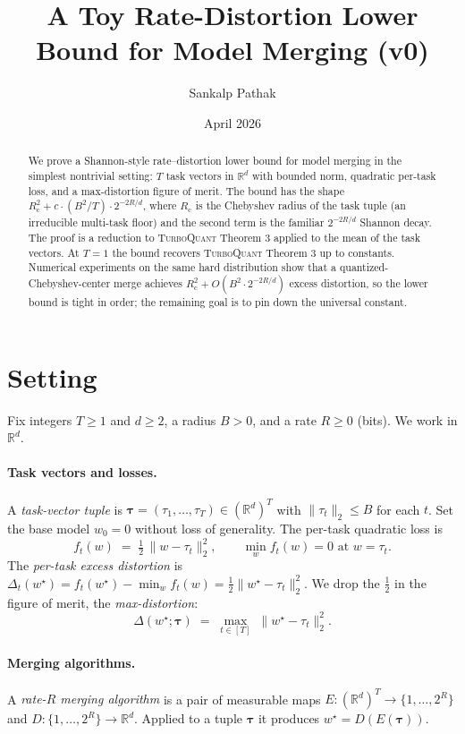 \documentclass{article}
\title{A Toy Rate-Distortion Lower Bound for Model Merging (v0)}
\author{Sankalp Pathak}
\date{April 2026}
\theoremstyle{remark}
\newcommand{\R}{\mathbb{R}}
\newcommand{\cheb}{R_{\mathrm{c}}}
\begin{document}
\maketitle

\begin{abstract}
We prove a Shannon-style rate--distortion lower bound for
model merging in the simplest nontrivial setting: $T$ task vectors
in $\R^d$ with bounded norm, quadratic per-task loss, and a
max-distortion figure of merit. The bound has the shape
$\cheb^2 + c \cdot (B^2/T) \cdot 2^{-2R/d}$, where $\cheb$ is the
Chebyshev radius of the task tuple (an irreducible multi-task floor)
and the second term is the familiar $2^{-2R/d}$ Shannon decay.
The proof is a reduction to \textsc{TurboQuant} Theorem 3 applied to
the mean of the task vectors. At $T=1$ the bound recovers
\textsc{TurboQuant} Theorem 3 up to constants. Numerical experiments
on the same hard distribution show that a quantized-Chebyshev-center
merge achieves $\cheb^2 + O(B^2 \cdot 2^{-2R/d})$ excess distortion,
so the lower bound is tight in order; the remaining goal is
to pin down the universal constant.
\end{abstract}

\section{Setting}\label{sec:setting}

Fix integers $T \geq 1$ and $d \geq 2$, a radius $B > 0$, and a rate
$R \geq 0$ (bits). We work in $\R^d$.

\paragraph{Task vectors and losses.} A \emph{task-vector tuple} is
$\boldsymbol{\tau} = (\tau_1,\dots,\tau_T) \in (\R^d)^T$ with
$\|\tau_t\|_2 \leq B$ for each $t$. Set the base model $w_0 = 0$
without loss of generality. The per-task quadratic loss is
\[
  f_t(w) \;=\; \tfrac{1}{2}\,\|w - \tau_t\|_2^2, \qquad
  \min_w f_t(w) = 0 \text{ at } w = \tau_t.
\]
The \emph{per-task excess distortion} is $\Delta_t(w^\star) =
f_t(w^\star) - \min_w f_t(w) = \tfrac12 \|w^\star - \tau_t\|_2^2$. We
drop the $\tfrac12$ in the figure of merit, the \emph{max-distortion}:
\[
  \Delta(w^\star; \boldsymbol\tau) \;=\; \max_{t\in[T]}\;
  \|w^\star - \tau_t\|_2^2.
\]

\paragraph{Merging algorithms.} A \emph{rate-$R$ merging
algorithm} is a pair of measurable maps
$E : (\R^d)^T \to \{1,\dots,2^R\}$ and
$D : \{1,\dots,2^R\} \to \R^d$. Applied to a tuple
$\boldsymbol\tau$ it produces $w^\star = D(E(\boldsymbol\tau))$.
\end{document}

